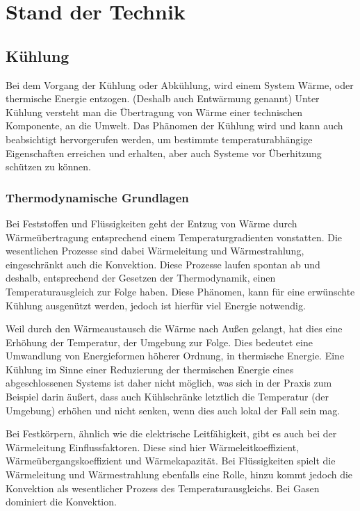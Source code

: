 \chapter{Stand der Technik}



\section{Kühlung} 

Bei dem Vorgang der Kühlung oder Abkühlung, wird einem System Wärme, oder thermische Energie entzogen. (Deshalb auch Entwärmung genannt)
Unter Kühlung versteht man die Übertragung von Wärme einer technischen Komponente, an die Umwelt. Das Phänomen der Kühlung wird und kann auch beabsichtigt hervorgerufen werden, um bestimmte temperaturabhängige Eigenschaften erreichen und erhalten, aber auch Systeme vor Überhitzung schützen zu können. 



\subsection{Thermodynamische Grundlagen}

Bei Feststoffen und Flüssigkeiten geht der Entzug von Wärme durch Wärmeübertragung entsprechend einem Temperaturgradienten vonstatten. Die wesentlichen Prozesse sind dabei Wärmeleitung und Wärmestrahlung, eingeschränkt auch die Konvektion. Diese Prozesse laufen spontan ab und deshalb, entsprechend der Gesetzen der Thermodynamik, einen Temperaturausgleich zur Folge haben. Diese Phänomen, kann für eine erwünschte Kühlung ausgenützt werden, jedoch ist hierfür viel Energie notwendig.  

Weil durch den Wärmeaustausch die Wärme nach Außen gelangt, hat dies eine Erhöhung der Temperatur, der Umgebung zur Folge. Dies bedeutet eine Umwandlung von Energieformen höherer Ordnung, in thermische Energie. Eine Kühlung im Sinne einer Reduzierung der thermischen Energie eines abgeschlossenen Systems ist daher nicht möglich, was sich in der Praxis zum Beispiel darin äußert, dass auch Kühlschränke letztlich die Temperatur (der Umgebung) erhöhen und nicht senken, wenn dies auch lokal der Fall sein mag.

Bei Festkörpern, ähnlich wie die elektrische Leitfähigkeit, gibt es auch bei der Wärmeleitung Einflussfaktoren. Diese sind hier Wärmeleitkoeffizient, Wärmeübergangskoeffizient und Wärmekapazität. Bei Flüssigkeiten spielt die Wärmeleitung und Wärmestrahlung ebenfalls eine Rolle, hinzu kommt jedoch die Konvektion als wesentlicher Prozess des Temperaturausgleichs. Bei Gasen dominiert die Konvektion.

